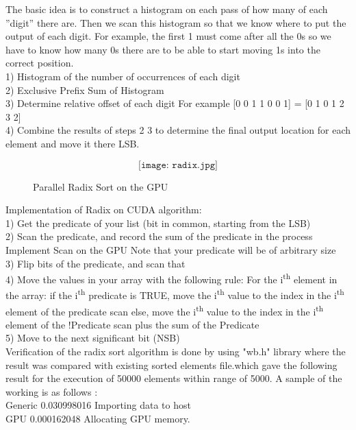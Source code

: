 \documentclass[conference]{IEEEtran}
\begin{document}
The basic idea is to construct a histogram on each pass
of how many of each ”digit” there are. Then we scan this
histogram so that we know where to put the output of each
digit. For example, the first 1 must come after all the 0s so
we have to know how many 0s there are to be able to start
moving 1s into the correct position.
\\1) Histogram of the number of occurrences of each digit
\\2) Exclusive Prefix Sum of Histogram
\\3) Determine relative offset of each digit
For example [0 0 1 1 0 0 1] = [0 1 0 1 2 3 2]
\\4) Combine the results of steps 2 3 to determine the final
output location for each element and move it there LSB.
\begin{figure}[h]
\[\texttt{[image: radix.jpg]}\]
\caption{Parallel Radix Sort on the GPU}
\end{figure}

Implementation of Radix on CUDA algorithm:
\\1) Get the predicate of your list (bit in common, starting
from the LSB)
\\2) Scan the predicate, and record the sum of the predicate in
the process
Implement Scan on the GPU
Note that your predicate will be of arbitrary size
\\3) Flip bits of the predicate, and scan that
\\4) Move the values in your array with the following rule:
For the i\textsuperscript{th} element in the array:
if the i\textsuperscript{th} predicate is TRUE, move the i\textsuperscript{th} value to the index
in the i\textsuperscript{th} element of the predicate scan
else, move the i\textsuperscript{th} value to the index in the i\textsuperscript{th} element of the
!Predicate scan plus the sum of the Predicate
\\5) Move to the next significant bit (NSB)\\

Verification of the radix sort algorithm is done by using "wb.h" library where the result was compared with existing sorted elements file.which gave the following result for the execution of 50000 elements within range of 5000.
A sample of the working is as follows :\\


 Generic 0.030998016 Importing data to host\\

 GPU     0.000162048 Allocating GPU memory.\\
\end{document}
